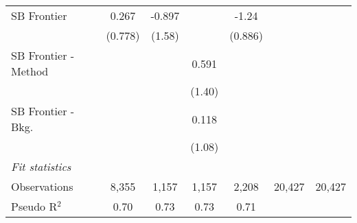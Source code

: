 \begin{tabular}{lcccccc}
   SB Frontier          & 0.267    & -0.897       &              & -1.24       &        &   \\   
                        & (0.778)  & (1.58)       &              & (0.886)     &        &   \\   
   SB Frontier - Method &          &              & 0.591        &             &        &   \\   
                        &          &              & (1.40)       &             &        &   \\   
   SB Frontier - Bkg.   &          &              & 0.118        &             &        &   \\   
                        &          &              & (1.08)       &             &        &   \\   
   \midrule
   \emph{Fit statistics}\\
   Observations         & 8,355    & 1,157        & 1,157        & 2,208       & 20,427 & 20,427\\  
   Pseudo R$^2$         & 0.70     & 0.73         & 0.73         & 0.71        &        & \\  
   

\end{tabular}
